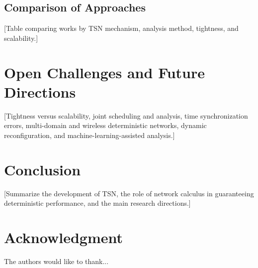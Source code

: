 \documentclass[journal]{IEEEtran}
\begin{document}
\subsection{Comparison of Approaches}
[Table comparing works by TSN mechanism, analysis method, tightness, and scalability.]



\section{Open Challenges and Future Directions}
\label{sec:challenges}
[Tightness versus scalability, joint scheduling and analysis, time synchronization errors, multi-domain and wireless deterministic networks, dynamic reconfiguration, and machine-learning-assisted analysis.]


\section{Conclusion}
\label{sec:conclusion}
[Summarize the development of TSN, the role of network calculus in guaranteeing deterministic performance, and the main research directions.]


\section*{Acknowledgment}
The authors would like to thank...


\ifCLASSOPTIONcaptionsoff
  \newpage
\fi




\end{document}
